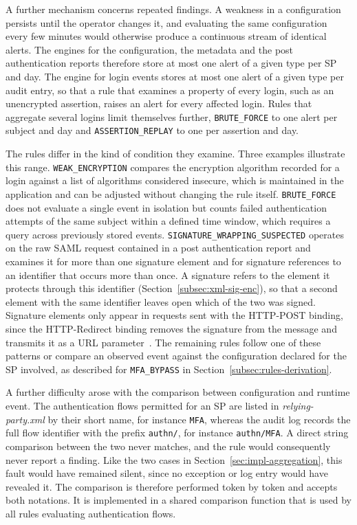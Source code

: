 \documentclass[../main.tex]{subfiles}
\begin{document}
A further mechanism concerns repeated findings. 
A weakness in a configuration persists until the operator changes it, and evaluating the same 
configuration every few minutes would otherwise produce a continuous stream of identical alerts. 
The engines for the configuration, the metadata and the post authentication reports therefore 
store at most one alert of a given type per SP and day. 
The engine for login events stores at most one alert of a given type per audit entry, so that a 
rule that examines a property of every login, such as an unencrypted assertion, raises an alert 
for every affected login. 
Rules that aggregate several logins limit themselves further, \texttt{BRUTE\_\allowbreak{}FORCE} to 
one alert per subject and day and \texttt{ASSERTION\_\allowbreak{}REPLAY} to one per assertion and day. 

The rules differ in the kind of condition they examine. 
Three examples illustrate this range. 
\texttt{WEAK\_\allowbreak{}ENCRYPTION} compares the encryption algorithm recorded for a login 
against a list of algorithms considered insecure, which is maintained in the application and 
can be adjusted without changing the rule itself. 
\texttt{BRUTE\_\allowbreak{}FORCE} does not evaluate a single event in isolation but counts failed 
authentication attempts of the same subject within a defined time window, which requires a query 
across previously stored events. 
\texttt{SIGNATURE\_\allowbreak{}WRAPPING\_\allowbreak{}SUSPECTED} operates on the raw SAML request 
contained in a post authentication report and examines it for more than one signature element and 
for signature references to an identifier that occurs more than once. 
A signature refers to the element it protects through this identifier 
(Section~\ref{subsec:xml-sig-enc}), so that a second element with the same identifier leaves open 
which of the two was signed. 
Signature elements only appear in requests sent with the HTTP-POST binding, since the HTTP-Redirect 
binding removes the signature from the message and transmits it as a URL parameter~\cite{SAMLBinding}. 
The remaining rules follow one of these patterns or compare an observed event against the 
configuration declared for the SP involved, as described for \texttt{MFA\_\allowbreak{}BYPASS} in 
Section~\ref{subsec:rules-derivation}. 

A further difficulty arose with the comparison between configuration and runtime event. 
The authentication flows permitted for an SP are listed in \textit{relying-party.xml} by their 
short name, for instance \texttt{MFA}, whereas the audit log records the full flow identifier 
with the prefix \texttt{authn/}, for instance \texttt{authn/MFA}. 
A direct string comparison between the two never matches, and the rule would consequently 
never report a finding. 
Like the two cases in Section~\ref{sec:impl-aggregation}, this fault would have remained silent, 
since no exception or log entry would have revealed it. 
The comparison is therefore performed token by token and accepts both notations. 
It is implemented in a shared comparison function that is used by all rules evaluating 
authentication flows.
\end{document}
